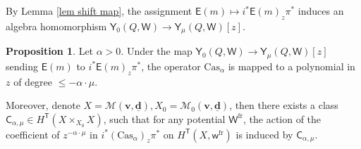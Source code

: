 \documentclass[10pt]{amsart}
\theoremstyle{definition}
\newtheorem{Proposition}[Theorem]{Proposition}
\numberwithin{equation}{section}
\newcommand{\bv}{\mathbf{v}}
\newcommand{\bd}{\mathbf{d}}
\newcommand{\cM}{\mathcal{M}}
\newcommand{\sE}{\mathsf{E}}
\newcommand{\sT}{\mathsf{T}}
\newcommand{\sW}{\mathsf{W}}
\newcommand{\sw}{\mathsf{w}}
\begin{document}
By Lemma \ref{lem shift map}, the assignment $\mathsf E(m)\mapsto i^*\sE(m)_z\pi^*$ induces an algebra homomorphism $\mathsf Y_0(Q,\sW)\to \mathsf Y_\mu(Q,\sW)[z]$.

\begin{Proposition}\label{prop shifted Casimir}
Let $\alpha>0$. Under the map $\mathsf Y_0(Q,\sW)\to \mathsf Y_\mu(Q,\sW)[z]$ sending $\mathsf E(m)$ to $i^*\sE(m)_z\pi^*$, the operator $\mathrm{Cas}_{\alpha}$ is mapped to a polynomial in $z$ of degree $\leqslant -\alpha\cdot \mu$. 

Moreover, denote $X=\cM(\bv,\underline{\bd}), X_0=\cM_0(\bv,\underline{\bd})$, then there exists a class $\mathsf C_{\alpha,\mu}\in H^{\sT}_{}(X\times_{X_0} X)$, such that for any potential $\sW^{\mathrm{fr}}$, the action of the coefficient of $z^{-\alpha\cdot \mu}$ in $i^*(\mathrm{Cas}_{\alpha})_z\pi^*$ on $H^\sT(X,\sw^{\mathrm{fr}})$ is induced by $\mathsf C_{\alpha,\mu}$.
\end{Proposition}
\end{document}
